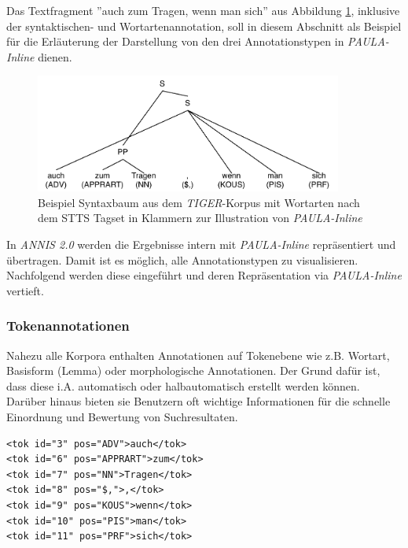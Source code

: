 Das Textfragment ''auch zum Tragen, wenn man sich'' aus Abbildung \ref{fig:Syntaxbaum.PAULA}, inklusive der syntaktischen- und Wortartenannotation, soll in diesem Abschnitt als Beispiel für die Erläuterung der Darstellung von den drei Annotationstypen in \emph{PAULA-Inline} dienen.

\begin{figure}[H]
	\centering
	\includegraphics*[width=0.9\textwidth]{figures/DA/Syntaxbaum-Paula.pdf}
	\caption{Beispiel Syntaxbaum aus dem \emph{TIGER}-Korpus mit Wortarten nach dem STTS Tagset \citep[][]{schiller1995stts} in Klammern zur Illustration von \emph{PAULA-Inline}}\label{fig:Syntaxbaum.PAULA}
\end{figure}

In \emph{ANNIS 2.0} werden die Ergebnisse intern mit \emph{PAULA-Inline} repräsentiert und übertragen. Damit ist es möglich, alle Annotationstypen zu visualisieren. Nachfolgend werden diese eingeführt und deren Repräsentation via \emph{PAULA-Inline} vertieft.

\subsubsection{Tokenannotationen}

Nahezu alle Korpora enthalten Annotationen auf Tokenebene wie z.B. Wortart, Basisform (Lemma) oder morphologische Annotationen. Der Grund dafür ist, dass diese i.A. automatisch oder halbautomatisch erstellt werden können. Darüber hinaus bieten sie Benutzern oft wichtige Informationen für die schnelle Einordnung und Bewertung von Suchresultaten.

\newpage
{}

\begin{lstlisting}
<tok id="3" pos="ADV">auch</tok>
<tok id="6" pos="APPRART">zum</tok>
<tok id="7" pos="NN">Tragen</tok>
<tok id="8" pos="$,">,</tok>
<tok id="9" pos="KOUS">wenn</tok>
<tok id="10" pos="PIS">man</tok>
<tok id="11" pos="PRF">sich</tok>
\end{lstlisting}

